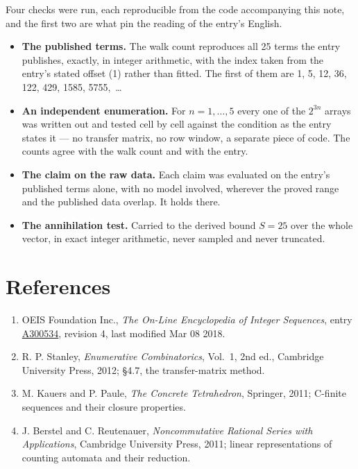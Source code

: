 \documentclass[11pt]{article}
\theoremstyle{definition}
\begin{document}
Four checks were run, each reproducible from the code accompanying this note, and the first two are what pin the reading of the entry's English.

\begin{itemize}

\item {\bfseries The published terms.} The walk count reproduces all 25 terms the entry publishes, exactly, in integer arithmetic, with the index taken from the entry's stated offset (1) rather than fitted. The first of them are 1, 5, 12, 36, 122, 429, 1585, 5755,~\dots

\item {\bfseries An independent enumeration.} For $n = 1,\dots,5$ every one of the $2^{3n}$ arrays was written out and tested cell by cell against the condition as the entry states it --- no transfer matrix, no row window, a separate piece of code. The counts agree with the walk count and with the entry.

\item {\bfseries The claim on the raw data.} Each claim was evaluated on the entry's published terms alone, with no model involved, wherever the proved range and the published data overlap. It holds there.

\item {\bfseries The annihilation test.} Carried to the derived bound $S = 25$ over the whole vector, in exact integer arithmetic, never sampled and never truncated.

\end{itemize}

\section{References}

\begin{enumerate}

\item OEIS Foundation Inc., \emph{The On-Line Encyclopedia of Integer Sequences}, entry \href{https://oeis.org/A300534}{A300534}, revision 4, last modified Mar 08 2018.

\item R. P. Stanley, \emph{Enumerative Combinatorics}, Vol.~1, 2nd ed., Cambridge University Press, 2012; \S4.7, the transfer-matrix method.

\item M. Kauers and P. Paule, \emph{The Concrete Tetrahedron}, Springer, 2011; C-finite sequences and their closure properties.

\item J. Berstel and C. Reutenauer, \emph{Noncommutative Rational Series with Applications}, Cambridge University Press, 2011; linear representations of counting automata and their reduction.

\end{enumerate}
\end{document}
